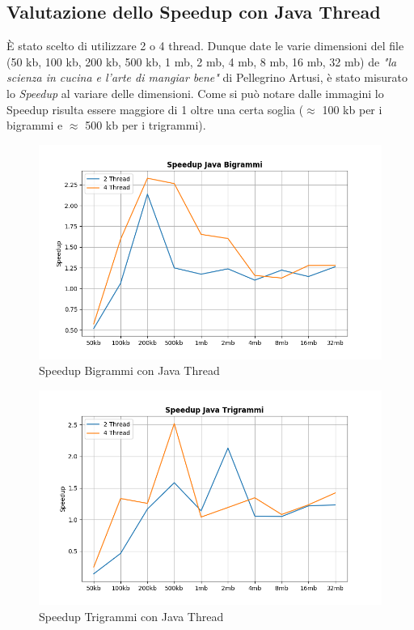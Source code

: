 \documentclass[10pt,twocolumn,letterpaper]{article}
\begin{document}
\subsection{Valutazione dello Speedup con Java Thread}
È stato scelto di utilizzare 2 o 4 thread.
Dunque date le varie dimensioni del file (50 kb, 100 kb, 200 kb, 500 kb, 1 mb, 2 mb, 4 mb, 8 mb, 16 mb, 32 mb) de \textit{"la scienza in cucina e l'arte di mangiar bene"} di Pellegrino Artusi, è stato misurato lo \textit{Speedup} al variare delle dimensioni.\newline
Come si può notare dalle immagini lo Speedup risulta essere maggiore di 1 oltre una certa soglia ($\approx$ 100 kb per i bigrammi e  $\approx$ 500 kb per i trigrammi).
\begin{figure}[h]
\includegraphics[width=\linewidth]{Plots/speedup_java_bigrammi.png}
\caption{Speedup Bigrammi con Java Thread}
\end{figure}

\begin{figure}[h]
\includegraphics[width=\linewidth]{Plots/speedup_java_trigrammi.png}
\caption{Speedup Trigrammi con Java Thread}
\end{figure}
\end{document}
